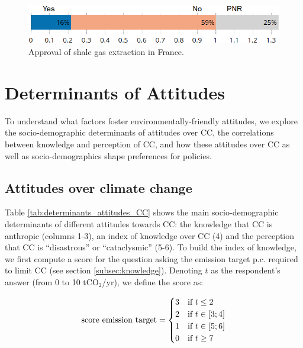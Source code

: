 \documentclass[english,5p,authoryear]{elsarticle}
\begin{document}
\begin{figure}[!htbp]
\centering
\includegraphics[width=0.9\columnwidth]{Images/shale_val_nolegend_trim.png}
\caption{Approval of shale gas extraction in France.}
\label{fig:shale}
\end{figure}



\section{Determinants of Attitudes\label{sec:determinants}}

To understand what factors foster environmentally-friendly attitudes, we explore the socio-demographic determinants of attitudes over CC, the correlations between knowledge and perception of CC, and how these attitudes over CC as well as socio-demographics shape preferences for policies. 

    \subsection{Attitudes over climate change}\label{sec:determinants_attitudes_CC}

Table \ref{tab:determinants_attitudes_CC} shows the main socio-demographic determinants of different attitudes towards CC: the knowledge that CC is anthropic (columns 1-3), an index of knowledge over CC (4) and the perception that CC is ``disastrous'' or ``cataclysmic'' (5-6). To build the index of knowledge, we first compute a score for the question asking the emission target p.c. required to limit CC (see section \ref{subsec:knowledge}). Denoting $t$ as the respondent's answer (from 0 to 10 tCO$_2$/yr), we define the score as:

\begin{equation}
\textnormal{score emission target}=\begin{cases}
3 & \text{if }t\leq2\\
2 & \text{if }t\in\left[3;4\right]\\
1 & \text{if }t\in\left[5;6\right]\\
0 & \text{if }t\geq7
\end{cases}
\end{equation}
\end{document}
